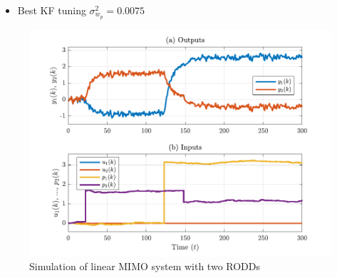 \begin{itemize}
	\item Best KF tuning $\sigma_{w_p}^2=0.0075$
\end{itemize}

\begin{figure}[htp]
	\centering
	\includegraphics[width=15cm]{images/rod_obs_sim2_ioplot.pdf}
	\caption{Simulation of linear MIMO system with two RODDs}
	\label{fig:rod-obs-sim-2-ioplot}
\end{figure}

